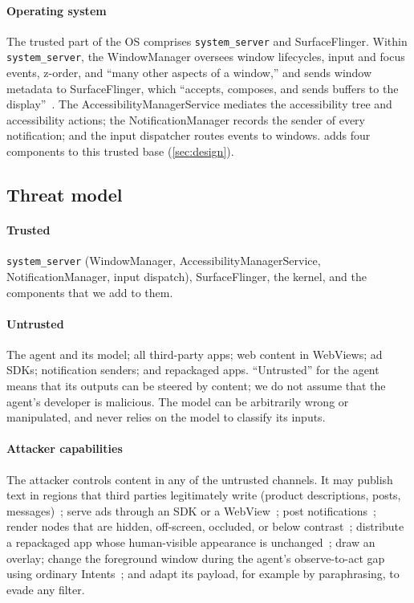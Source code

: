 \paragraph{Operating system} The trusted part of the OS comprises \texttt{system\_server} and SurfaceFlinger. Within \texttt{system\_server}, the WindowManager oversees window lifecycles, input and focus events, z-order, and ``many other aspects of a window,'' and sends window metadata to SurfaceFlinger, which ``accepts, composes, and sends buffers to the display''~\cite{android_surfaceflinger}. The AccessibilityManagerService mediates the accessibility tree and accessibility actions; the NotificationManager records the sender of every notification; and the input dispatcher routes events to windows. \PG{} adds four components to this trusted base (\cref{sec:design}).

\subsection{Threat model}\label{sec:threat}

\paragraph{Trusted} \texttt{system\_server} (WindowManager, AccessibilityManagerService, NotificationManager, input dispatch), SurfaceFlinger, the kernel, and the \PG{} components that we add to them.

\paragraph{Untrusted} The agent and its model; all third-party apps; web content in WebViews; ad SDKs; notification senders; and repackaged apps. ``Untrusted'' for the agent means that its outputs can be steered by content; we do not assume that the agent's developer is malicious. The model can be arbitrarily wrong or manipulated, and \PG{} never relies on the model to classify its inputs.

\paragraph{Attacker capabilities} The attacker controls content in any of the untrusted channels. It may publish text in regions that third parties legitimately write (product descriptions, posts, messages)~\cite{liu2026agenthazard}; serve ads through an SDK or a WebView~\cite{du2025measuringmobileagents}; post notifications~\cite{deivasigamani2026nota11y}; render nodes that are hidden, off-screen, occluded, or below contrast~\cite{li2026uidesync}; distribute a repackaged app whose human-visible appearance is unchanged~\cite{li2026uidesync}; draw an overlay; change the foreground window during the agent's observe-to-act gap using ordinary Intents~\cite{qian2026zeropermission}; and adapt its payload, for example by paraphrasing, to evade any filter.

